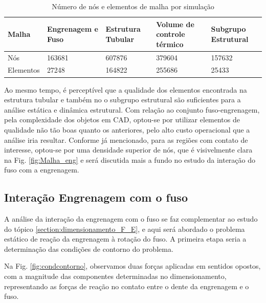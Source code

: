 \begin{table}[ht]
     \centering
     \caption{Número de nós e elementos de malha por simulação}
    \centering
     \begin{tabular}{|C{3cm}|C{3cm}|C{2.5cm}|C{2.5cm}|C{2.5cm}|}
       \hline
      \textbf{Malha} &
      \textbf{Engrenagem e Fuso} &
      \textbf{Estrutura Tubular} &
      \textbf{Volume de controle térmico} & \textbf{Subgrupo Estrutural}\\ \hline
        Nós & 163681 & 607876 & 379604 & 157632\\ \hline
         Elementos & 27248 & 164822 & 255686 & 25433 \\ \hline
         
        \end{tabular}
     \label{tab:nos}
\end{table}

Ao mesmo tempo, é perceptível que a qualidade dos elementos encontrada na estrutura tubular e também no o subgrupo estrutural são suficientes para a análise estática e dinâmica estrutural. Com relação ao conjunto fuso-engrenagem, pela complexidade dos objetos em CAD, optou-se por utilizar elementos de qualidade não tão boas quanto os anteriores, pelo alto custo operacional que a análise iria resultar. Conforme já mencionado, para as regiões com contato de interesse, optou-se por uma densidade superior de nós, que é visivelmente clara na Fig. \ref{fig:Malha_eng} e será discutida mais a fundo no estudo da interação do fuso com a engrenagem.


\subsection{Interação Engrenagem com o fuso}

A análise da interação da engrenagem com o fuso se faz complementar ao estudo do tópico \ref{section:dimensionamento_F_E}, e aqui será abordado o problema estático de reação da engrenagem à rotação do fuso. A primeira etapa seria a determinação das condições de contorno do problema.

Na Fig. \ref{fig:condcontorno}, observamos duas forças aplicadas em sentidos opostos, com a magnitude das componentes determinadas no dimensionamento, representando as forças de reação no contato entre o dente da engrenagem e o fuso.

